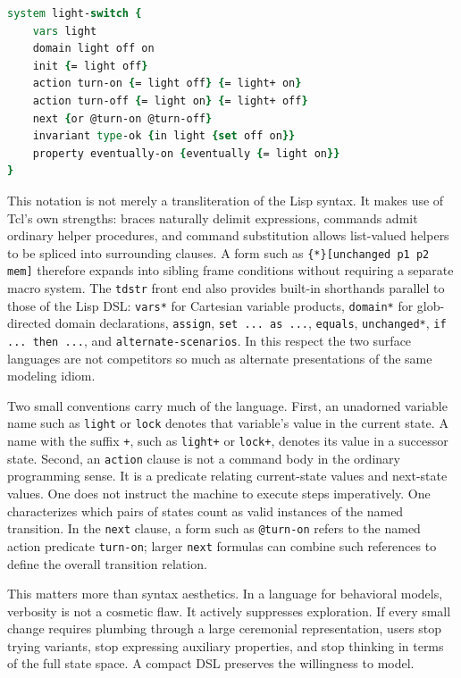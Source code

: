 \documentclass[11pt]{article}
\begin{document}
\begin{lstlisting}[language=tcl]
system light-switch {
    vars light
    domain light off on
    init {= light off}
    action turn-on {= light off} {= light+ on}
    action turn-off {= light on} {= light+ off}
    next {or @turn-on @turn-off}
    invariant type-ok {in light {set off on}}
    property eventually-on {eventually {= light on}}
}
\end{lstlisting}

This notation is not merely a transliteration of the Lisp syntax. It makes use
of Tcl's own strengths: braces naturally delimit expressions, commands admit
ordinary helper procedures, and command substitution allows list-valued helpers
to be spliced into surrounding clauses. A form such as
\texttt{\{*\}[unchanged p1 p2 mem]} therefore expands into sibling frame
conditions without requiring a separate macro system. The \texttt{tdstr} front
end also provides built-in shorthands parallel to those of the Lisp DSL:
\texttt{vars*} for Cartesian variable products, \texttt{domain*} for
glob-directed domain declarations, \texttt{assign}, \texttt{set ... as ...},
\texttt{equals}, \texttt{unchanged*}, \texttt{if ... then ...}, and
\texttt{alternate-scenarios}. In this respect the two surface languages are not
competitors so much as alternate presentations of the same modeling idiom.

Two small conventions carry much of the language. First, an unadorned variable
name such as \texttt{light} or \texttt{lock} denotes that variable's value in
the current state. A name with the suffix \texttt{+}, such as \texttt{light+}
or \texttt{lock+}, denotes its value in a successor state. Second, an
\texttt{action} clause is not a command body in the ordinary programming sense.
It is a predicate relating current-state values and next-state values. One does
not instruct the machine to execute steps imperatively. One characterizes which
pairs of states count as valid instances of the named transition. In the
\texttt{next} clause, a form such as \texttt{@turn-on} refers to the named
action predicate \texttt{turn-on}; larger \texttt{next} formulas can combine
such references to define the overall transition relation.

This matters more than syntax aesthetics. In a language for behavioral models,
verbosity is not a cosmetic flaw. It actively suppresses exploration. If every
small change requires plumbing through a large ceremonial representation, users
stop trying variants, stop expressing auxiliary properties, and stop thinking in
terms of the full state space. A compact DSL preserves the willingness to model.
\end{document}
